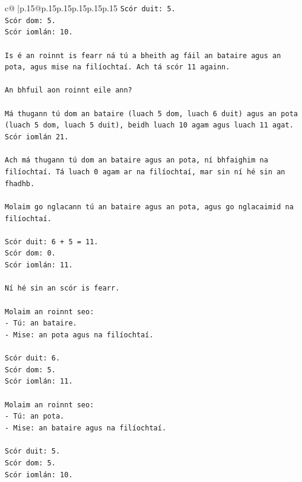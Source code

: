 \documentclass{article}
\begin{document}
{\begin{supertabular}{c@{$\;$}|p{.15\linewidth}@{}p{.15\linewidth}p{.15\linewidth}p{.15\linewidth}p{.15\linewidth}p{.15\linewidth}}
{{{\texttt{Scór duit: 5.} \\
\texttt{Scór dom: 5.} \\
\texttt{Scór iomlán: 10.} \\
\\ 
\texttt{Is é an roinnt is fearr ná tú a bheith ag fáil an bataire agus an pota, agus mise na filíochtaí. Ach tá scór 11 againn.} \\
\\ 
\texttt{An bhfuil aon roinnt eile ann?} \\
\\ 
\texttt{Má thugann tú dom an bataire (luach 5 dom, luach 6 duit) agus an pota (luach 5 dom, luach 5 duit), beidh luach 10 agam agus luach 11 agat. Scór iomlán 21.} \\
\\ 
\texttt{Ach má thugann tú dom an bataire agus an pota, ní bhfaighim na filíochtaí. Tá luach 0 agam ar na filíochtaí, mar sin ní hé sin an fhadhb.} \\
\\ 
\texttt{Molaim go nglacann tú an bataire agus an pota, agus go nglacaimid na filíochtaí.} \\
\\ 
\texttt{Scór duit: 6 + 5 = 11.} \\
\texttt{Scór dom: 0.} \\
\texttt{Scór iomlán: 11.} \\
\\ 
\texttt{Ní hé sin an scór is fearr.} \\
\\ 
\texttt{Molaim an roinnt seo:} \\
\texttt{{-} Tú: an bataire.} \\
\texttt{{-} Mise: an pota agus na filíochtaí.} \\
\\ 
\texttt{Scór duit: 6.} \\
\texttt{Scór dom: 5.} \\
\texttt{Scór iomlán: 11.} \\
\\ 
\texttt{Molaim an roinnt seo:} \\
\texttt{{-} Tú: an pota.} \\
\texttt{{-} Mise: an bataire agus na filíochtaí.} \\
\\ 
\texttt{Scór duit: 5.} \\
\texttt{Scór dom: 5.} \\
\texttt{Scór iomlán: 10.} \\
}}}
\end{supertabular}}
\end{document}
